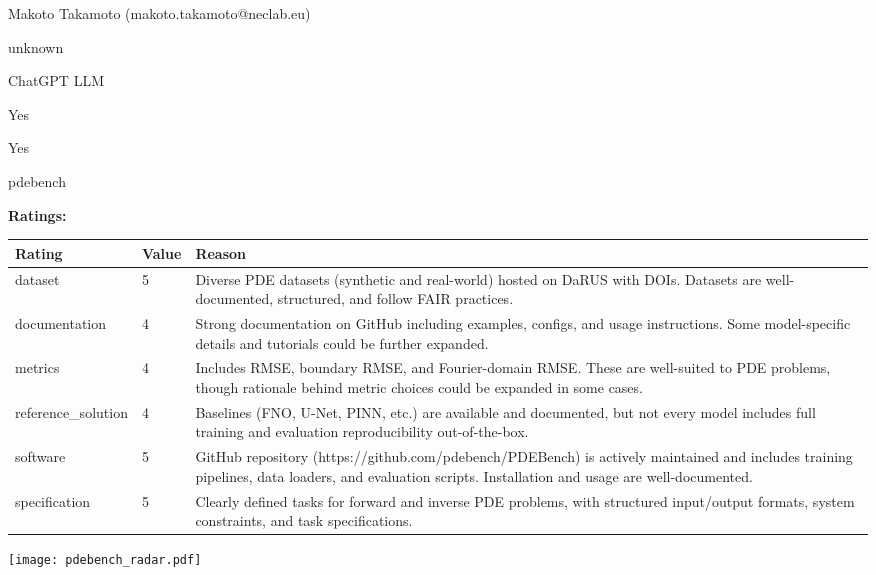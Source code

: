 {{\begin{description}[labelwidth=4cm, labelsep=1em, leftmargin=4cm, itemsep=0.1em, parsep=0em]
  \item[contact.name:] Makoto Takamoto (makoto.takamoto@neclab.eu)
  \item[contact.email:] unknown
  \item[results.links.name:] ChatGPT LLM
  \item[fair.reproducible:] Yes
  \item[fair.benchmark\_ready:] Yes
  \item[id:] pdebench
  \item[Citations:] \cite{takamoto2024pdebenchextensivebenchmarkscientific}
\end{description}

{\bf Ratings:} ~ \\

\begin{tabular}{p{} p{} p{}}
\hline
Rating & Value & Reason \\
\hline
dataset & 5 & Diverse PDE datasets (synthetic and real-world) hosted on DaRUS with DOIs. Datasets are
well-documented, structured, and follow FAIR practices.
 \\
documentation & 4 & Strong documentation on GitHub including examples, configs, and usage instructions.
Some model-specific details and tutorials could be further expanded.
 \\
metrics & 4 & Includes RMSE, boundary RMSE, and Fourier-domain RMSE. These are well-suited to PDE problems,
though rationale behind metric choices could be expanded in some cases.
 \\
reference\_solution & 4 & Baselines (FNO, U-Net, PINN, etc.) are available and documented, but not every model
includes full training and evaluation reproducibility out-of-the-box.
 \\
software & 5 & GitHub repository (https://github.com/pdebench/PDEBench) is actively maintained and includes
training pipelines, data loaders, and evaluation scripts. Installation and usage are well-documented.
 \\
specification & 5 & Clearly defined tasks for forward and inverse PDE problems, with structured input/output formats,
system constraints, and task specifications.
 \\
\hline
\end{tabular}

\texttt{[image: pdebench\_radar.pdf]}
}}
\clearpage